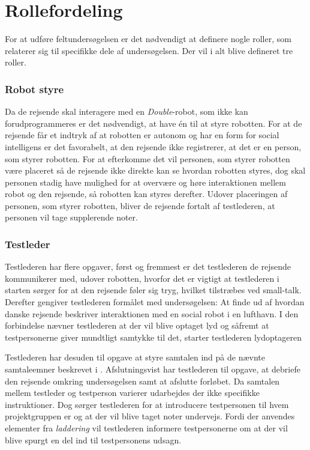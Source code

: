 \section{Rollefordeling}
\label{ParametreRollefordeling}
%
For at udføre feltundersøgelsen er det nødvendigt at definere nogle roller, som relaterer sig til specifikke dele af undersøgelsen. Der vil i alt blive defineret tre roller.
%
\subsubsection*{Robot styre}
Da de rejsende skal interagere med en \textit{Double}-robot, som ikke kan forudprogrammeres er det nødvendigt, at have én til at styre robotten. For at de rejsende får et indtryk af at robotten er autonom og har en form for social intelligens er det favorabelt, at den rejsende ikke registrerer, at det er en person, som styrer robotten. For at efterkomme det vil personen, som styrer robotten være placeret så de rejsende ikke direkte kan se hvordan robotten styres, dog skal personen stadig have mulighed for at overvære og høre interaktionen mellem robot og den rejsende, så robotten kan styres derefter. Udover placeringen af personen, som styrer robotten, bliver de rejsende fortalt af testlederen, at personen vil tage supplerende noter. 

\subsubsection*{Testleder}
Testlederen har flere opgaver, først og fremmest er det testlederen de rejsende kommunikerer med, udover robotten, hvorfor det er vigtigt at testlederen i starten sørger for at den rejsende føler sig tryg, hvilket tilstræbes ved small-talk. Derefter gengiver testlederen formålet med undersøgelsen: At finde ud af hvordan danske rejsende beskriver interaktionen med en social robot i en lufthavn. I den forbindelse nævner testlederen at der vil blive optaget lyd og såfremt at testpersonerne giver mundtligt samtykke til det, starter testlederen lydoptageren

Testlederen har desuden til opgave at styre samtalen ind på de nævnte samtaleemner beskrevet i . Afslutningsvist har testlederen til opgave, at debriefe den rejsende omkring undersøgelsen samt at afslutte forløbet. Da samtalen mellem testleder og testperson varierer udarbejdes der ikke specifikke instruktioner. Dog sørger testlederen for at introducere testpersonen til hvem projektgruppen er og at der vil blive taget noter undervejs. Fordi der anvendes elementer fra \textit{laddering} vil testlederen informere testpersonerne om at der vil blive spurgt en del ind til testpersonens udsagn.

